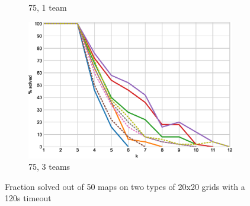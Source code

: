 \documentclass[english,10pt]{article}
\begin{document}
\begin{figure}[t]
\begin{subfigure}{0.44\textwidth}
		\caption{75, 1 team}
		\label{fig:75-1-p}
	\end{subfigure}
	\begin{subfigure}{0.44\textwidth}
		\centering
		\includegraphics[width=\linewidth]{img/results/icts-comparison/75-3-p}
		\caption{75, 3 teams}
		\label{fig:75-3-p}
	\end{subfigure}
	\caption{Fraction solved out of 50 maps on two types of 20x20 grids with a 120s timeout}
	\label{fig:probs}
	\end{figure}
\end{document}
